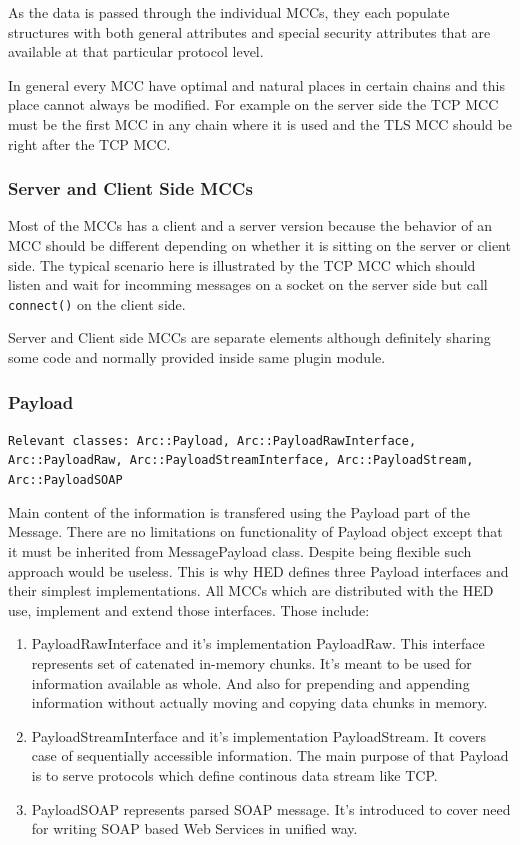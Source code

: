 \documentclass{book}
\begin{document}
As the data is passed through the individual MCCs, they each populate structures with both general attributes and special security attributes that are available at that particular protocol level.

In general every MCC have optimal and natural places in certain chains and this place cannot always be modified. For example on the server side the TCP MCC must be the first MCC in any chain where it is used and the TLS MCC should be right after the TCP MCC.


\subsubsection{Server and Client Side MCCs}

Most of the MCCs has a client and a server version because the behavior of an MCC should be different depending on whether it is sitting on the server or client side. The typical scenario here is illustrated by the TCP MCC which should listen and wait for incomming messages on a socket on the server side but call \texttt{connect()} on the client side.

Server and Client side MCCs are separate elements although definitely sharing some code and normally provided inside same plugin module.


\subsubsection{Payload}

\texttt{Relevant classes: Arc::Payload, Arc::PayloadRawInterface, Arc::PayloadRaw, Arc::PayloadStreamInterface, Arc::PayloadStream, Arc::PayloadSOAP}

Main content of the information is transfered using the Payload part of the Message. There are no limitations on functionality of Payload object except that it must be inherited from MessagePayload class. Despite being flexible such approach would be useless. This is why HED defines three Payload interfaces and their simplest implementations. All MCCs which are distributed with the HED use, implement and extend those interfaces. Those include:

\begin{enumerate}

\item PayloadRawInterface and it's implementation PayloadRaw. This interface represents set of catenated in-memory chunks. It's meant to be used for information available as whole. And also for prepending and appending information without actually moving and copying data chunks in memory.

\item PayloadStreamInterface and it's implementation PayloadStream. It covers case of sequentially accessible information. The main purpose of that Payload is to serve protocols which define continous data stream like TCP.

\item PayloadSOAP represents parsed SOAP message. It's introduced to cover need for writing SOAP based Web Services in unified way.

\end{enumerate}
\end{document}
